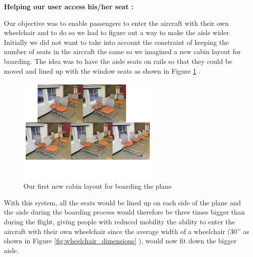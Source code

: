 





\textbf{Helping our user access his/her seat :}

Our objective was to enable passengers to enter the aircraft with their own wheelchair and to do so we had to figure out a way to make the aisle wider. Initially we did not want to take into account the constraint of keeping the number of seats in the aircraft the same so we imagined a new cabin layout for boarding. The idea was to have the aisle seats on rails so that they could be moved and lined up with the window seats as shown in Figure \ref{fig:first_new_cabin_layout} . 

\begin{figure}[h]
  \centering
     \includegraphics[width=7cm]{images/first_new_cabin_layout.png}
   \caption{Our first new cabin layout for boarding the plane}
  \label{fig:first_new_cabin_layout}
\end{figure} 

With this system, all the seats would be lined up on each side of the plane and the aisle during the boarding process would therefore be three times bigger than during the flight, giving people with reduced mobility the ability to enter the aircraft with their own wheelchair since the average width of a wheelchair (30’’ as shown in Figure \ref{fig:wheelchair_dimensions} ), would now fit down the bigger aisle. 

